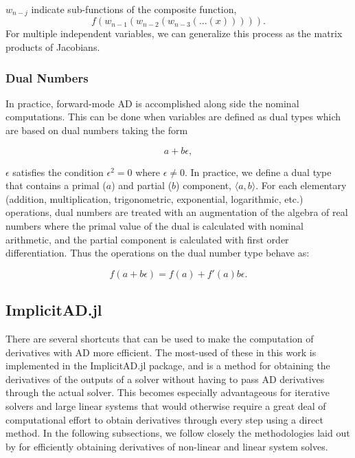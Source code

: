 \where \(w_{n-j}\) indicate sub-functions of the composite function, \[f(w_{n-1}(w_{n-2}(w_{n-3}(...(x))))).\]
%
For multiple independent variables, we can generalize this process as the matrix products of Jacobians.

\subsubsection{Dual Numbers}

In practice, forward-mode AD is accomplished along side the nominal computations.
%
This can be done when variables are defined as dual types which are based on dual numbers taking the form

\begin{equation}
    a + b\epsilon,
\end{equation}

\where \(\epsilon\) satisfies the condition \(\epsilon^2 = 0\) where \(\epsilon \neq 0\).
%
In practice, we define a dual type that contains a primal (\(a\)) and partial (\(b\)) component, \(\langle a, b \rangle\).
%
For each elementary (addition, multiplication, trigonometric, exponential, logarithmic, etc.) operations, dual numbers are treated with an augmentation of the algebra of real numbers where the primal value of the dual is calculated with nominal arithmetic, and the partial component is calculated with first order differentiation.
%
Thus the operations on the dual number type behave as:

\begin{equation}
    f(a + b\epsilon) = f(a) + f'(a)  b \epsilon.
\end{equation}



\subsection{ImplicitAD.jl}

There are several shortcuts that can be used to make the computation of derivatives with AD more efficient.
%
The most-used of these in this work is implemented in the ImplicitAD.jl package, and is a method for obtaining the derivatives of the outputs of a solver without having to pass AD derivatives through the actual solver.
%
This becomes especially advantageous for iterative solvers and large linear systems that would otherwise require a great deal of computational effort to obtain derivatives through every step using a direct method.
%
In the following subsections, we follow closely the methodologies laid out by \citeauthor{Ning_2023} for efficiently obtaining derivatives of non-linear and linear system solves.

